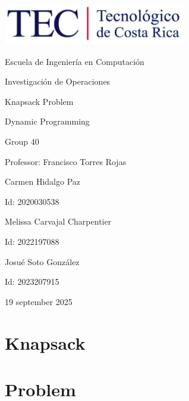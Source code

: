 \documentclass{article}
\begin{document}
\begin{titlepage}
    \centering
    \includegraphics[width=0.6\textwidth]{logo-tec.png}\par\vspace{1cm}

    {\large Escuela de Ingeniería en Computación\par}
    {\large Investigación de Operaciones\par}
    \vspace{2cm}

    {\Large Knapsack Problem\par}
    {\large Dynamic Programming\par}
    \vspace{2cm}

    {\large Group 40\par}
    {\large Professor: Francisco Torres Rojas\par}
    \vspace{3cm}

    {\large Carmen Hidalgo Paz\par}
    {\large Id: 2020030538\par}
    \vspace{1cm}
    {\large Melissa Carvajal Charpentier\par}
    {\large Id: 2022197088\par}
    \vspace{1cm}
    {\large Josué Soto González\par}
    {\large Id: 2023207915\par}
    \vspace{1cm}

    {\large 19 september 2025\par}
\end{titlepage}

\newpage


\section{Knapsack}
\section{Problem}
\end{document}
